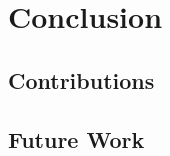 \documentclass[../techreport.tex]{subfiles}
\begin{document}
\section{Conclusion}
\subsection{Contributions}
\subsection{Future Work}
\end{document}
